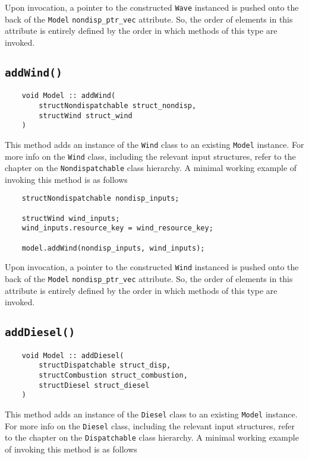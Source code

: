 \documentclass[12pt, letterpaper]{report}
\begin{document}
\noindent Upon invocation, a pointer to the constructed \texttt{Wave} instanced is pushed onto the back of the \texttt{Model} \texttt{nondisp\_ptr\_vec} attribute. So, the order of elements in this attribute is entirely defined by the order in which methods of this type are invoked.

\subsection{\texttt{addWind(\;\;)}}

\begin{verbatim}
    void Model :: addWind(
        structNondispatchable struct_nondisp,
        structWind struct_wind
    )
\end{verbatim}

This method adds an instance of the \texttt{Wind} class to an existing \texttt{Model} instance. For more info on the \texttt{Wind} class, including the relevant input structures, refer to the chapter on the \texttt{Nondispatchable} class hierarchy. A minimal working example of invoking this method is as follows

\begin{verbatim}
    structNondispatchable nondisp_inputs;
    
    structWind wind_inputs;
    wind_inputs.resource_key = wind_resource_key;
    
    model.addWind(nondisp_inputs, wind_inputs);
\end{verbatim}

\noindent Upon invocation, a pointer to the constructed \texttt{Wind} instanced is pushed onto the back of the \texttt{Model} \texttt{nondisp\_ptr\_vec} attribute. So, the order of elements in this attribute is entirely defined by the order in which methods of this type are invoked.

\subsection{\texttt{addDiesel(\;\;)}}

\begin{verbatim}
    void Model :: addDiesel(
        structDispatchable struct_disp,
        structCombustion struct_combustion,
        structDiesel struct_diesel
    )
\end{verbatim}

This method adds an instance of the \texttt{Diesel} class to an existing \texttt{Model} instance. For more info on the \texttt{Diesel} class, including the relevant input structures, refer to the chapter on the \texttt{Dispatchable} class hierarchy. A minimal working example of invoking this method is as follows
\end{document}
